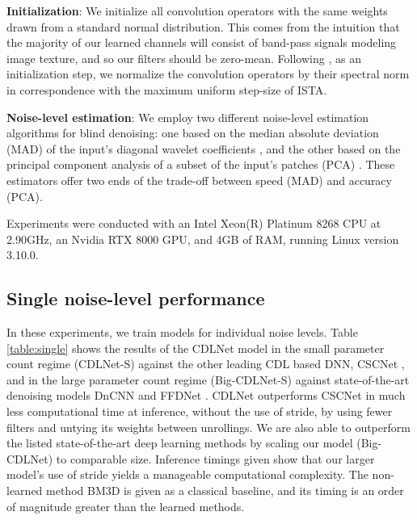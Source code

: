 \documentclass[conference]{IEEEtran}
\newcommand{\soa}{state-of-the-art }
\begin{document}
\textbf{Initialization}: We initialize all convolution operators with the same weights drawn from a standard normal distribution. This comes from the intuition that the majority of our learned channels will consist of band-pass signals modeling image texture, and so our filters should be zero-mean. Following \cite{Simon2019}, as an initialization step, we normalize the convolution operators by their spectral norm in correspondence with the maximum uniform step-size of ISTA.

\textbf{Noise-level estimation}: We employ two different noise-level estimation algorithms for blind denoising: one based on the median absolute deviation (MAD) of the input's diagonal wavelet coefficients \cite{Chang2000}, and the other based on the principal component analysis of a subset of the input's patches (PCA) \cite{Liu2013}. These estimators offer two ends of the trade-off between speed (MAD) and accuracy (PCA).

Experiments were conducted with an Intel Xeon(R) Platinum 8268 CPU at 2.90GHz, an Nvidia RTX 8000 GPU, and 4GB of RAM, running Linux version 3.10.0.

\subsection{Single noise-level performance} \label{sec:exp_single}
In these experiments, we train models for individual noise levels. Table \ref{table:single} shows the results of the CDLNet model in the small parameter count regime  (CDLNet-S) against the other leading CDL based DNN, CSCNet \cite{Simon2019}, and in the large parameter count regime (Big-CDLNet-S) against \soa denoising models DnCNN \cite{DnCNN} and FFDNet \cite{FFDNet}. CDLNet outperforms CSCNet in much less computational time at inference, without the use of stride, by using fewer filters and untying its weights between unrollings. We are also able to outperform the listed \soa deep learning methods by scaling our model (Big-CDLNet) to comparable size. Inference timings given show that our larger model's use of stride yields a manageable computational complexity. The non-learned method BM3D \cite{bm3d} is given as a classical baseline, and its timing is an order of magnitude greater than the learned methods.
\end{document}
